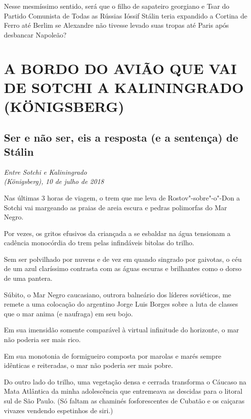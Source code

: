 Nesse mesmíssimo sentido, será que o filho de sapateiro georgiano e Tsar
do Partido Comunista de Todas as Rússias Ióssif Stálin teria expandido a
Cortina de Ferro até Berlim se Alexandre  não tivesse levado suas
tropas até Paris após desbancar Napoleão?

\part{A BORDO DO AVIÃO QUE VAI DE SOTCHI A KALININGRADO (KÖNIGSBERG)}

\chapter*{Ser e não ser, eis a resposta (e a sentença) de Stálin}

\begin{flushright}
\emph{Entre Sotchi e Kaliningrado\\(Königsberg), 10 de julho de 2018}
\end{flushright}

Nas últimas 3 horas de viagem, o trem que me leva de Rostov"-sobre"-o"-Don
a Sotchi vai margeando as praias de areia escura e pedras polimorfas do
Mar Negro.

Por vezes, os gritos efusivos da criançada a se esbaldar na água
tensionam a cadência monocórdia do trem pelas infindáveis bitolas do
trilho.

Sem ser polvilhado por nuvens e de vez em quando singrado por gaivotas,
o céu de um azul claríssimo contrasta com as águas escuras e brilhantes
como o dorso de uma pantera.

Súbito, o Mar Negro caucasiano, outrora balneário dos líderes
soviéticos, me remete a uma colocação do argentino Jorge Luis Borges
sobre a luta de classes que o mar anima (e naufraga) em seu bojo.

Em sua imensidão somente comparável à virtual infinitude do horizonte, o
mar não poderia ser mais rico.

Em sua monotonia de formigueiro composta por marolas e marés sempre
idênticas e reiteradas, o mar não poderia ser mais pobre.

Do outro lado do trilho, uma vegetação densa e cerrada transforma o
Cáucaso na Mata Atlântica da minha adolescência que entremeava as
descidas para o litoral sul de São Paulo. (Só faltam as chaminés
fosforescentes de Cubatão e os caiçaras vivazes vendendo espetinhos de
siri.)

